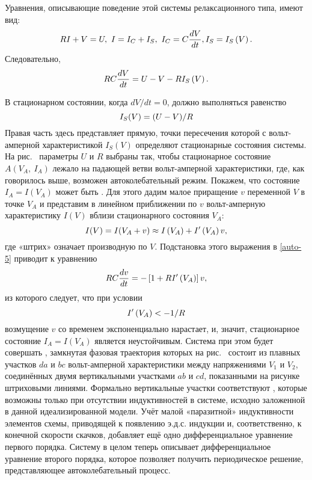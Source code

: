 
Уравнения, описывающие поведение этой системы релаксационного типа,
имеют вид:
\begin{equation}
	\eqmark{auto-4}
	RI+V=U,~ I=I_C+I_S,~ I_C=C\frac{dV}{dt}, I_S=I_S\left( V \right).
\end{equation}
Следовательно,
\begin{equation}
	\eqmark{auto-5}
	RC\frac{dV}{dt}=U-V-R{{I}_{S}}\left( V \right).
\end{equation}

В стационарном состоянии, когда $dV / dt = 0$, должно выполняться равенство
\begin{equation}
	\eqmark{auto-6}
	I_S(V)=(U-V)/R
\end{equation}
Правая часть здесь представляет  прямую, точки
пересечения которой с вольт-амперной характеристикой ${{I}_{S}}\left( V \right)$
определяют стационарные состояния системы. На рис.~ параметры $U$
и $R$ выбраны так, чтобы стационарное состояние $A(V_A,~I_A)$ лежало на падающей
ветви вольт-амперной характеристики, где, как говорилось выше, возможен
автоколебательный режим. Покажем, что состояние $I_A=I(V_A)$ может быть
. Для этого дадим малое приращение $v$ переменной $V$ в
точке
$V_A$ и представим в линейном приближении по $v$ вольт-амперную характеристику
$I(V)$ вблизи стационарного состояния $V_A$:
\begin{equation}
	\eqmark{auto-7}
	I(V)=I(V_A + v)\approx I\left( V_A \right)+{I}'\left( V_A \right)v,
\end{equation}
где «штрих» означает производную по $V$. Подстановка этого выражения в
\eqref{auto-5} приводит к уравнению
\begin{equation}
	\eqmark{auto-8}
	RC\frac{dv}{dt}=-\left[ 1+R{I}'\left( V_A \right) \right]v,
\end{equation}
из которого следует, что при условии
\begin{equation}
	\eqmark{auto-9}
	I'\left( V_A \right) <- {1}/{R}
\end{equation}
возмущение $v$ со временем экспоненциально нарастает, и, значит, стационарное
состояние $I_A=I(V_A)$ является неустойчивым. Система при этом будет совершать
, замкнутая фазовая траектория которых
на рис.~ состоит из плавных участков $da$ и $bc$ вольт-амперной
характеристики между напряжениями $V_1$ и $V_2$, соединённых двумя вертикальными
участками $ab$ и $cd$, показанными на рисунке штриховыми линиями. Формально
вертикальные участки соответствуют , которые возможны
только при отсутствии индуктивностей в системе, исходно заложенной в данной
идеализированной модели. Учёт малой «паразитной» индуктивности элементов схемы,
приводящей к появлению э.д.с. индукции и, соответственно, к конечной скорости
скачков, добавляет ещё одно дифференциальное уравнение первого порядка. Систему
в целом теперь описывает дифференциальное уравнение второго порядка, которое
позволяет получить периодическое решение, представляющее автоколебательный
процесс.
